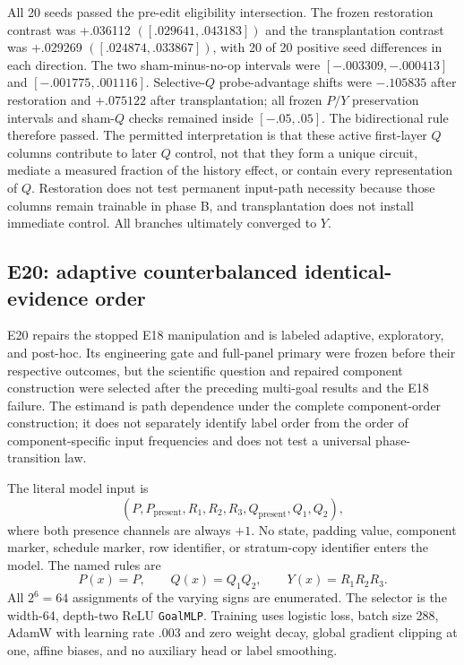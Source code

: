 \documentclass[11pt,a4paper]{article}
\begin{document}
All 20 seeds passed the pre-edit eligibility intersection. The frozen restoration contrast was +.036112 $([.029641,.043183])$ and the transplantation contrast was +.029269 $([.024874,.033867])$, with 20 of 20 positive seed differences in each direction. The two sham-minus-no-op intervals were $[-.003309,-.000413]$ and $[-.001775,.001116]$. Selective-$Q$ probe-advantage shifts were $-.105835$ after restoration and $+.075122$ after transplantation; all frozen $P/Y$ preservation intervals and sham-$Q$ checks remained inside $[-.05,.05]$. The bidirectional rule therefore passed. The permitted interpretation is that these active first-layer $Q$ columns contribute to later $Q$ control, not that they form a unique circuit, mediate a measured fraction of the history effect, or contain every representation of $Q$. Restoration does not test permanent input-path necessity because those columns remain trainable in phase B, and transplantation does not install immediate control. All branches ultimately converged to $Y$.

\subsection{E20: adaptive counterbalanced identical-evidence order}

E20 repairs the stopped E18 manipulation and is labeled adaptive, exploratory, and post-hoc. Its engineering gate and full-panel primary were frozen before their respective outcomes, but the scientific question and repaired component construction were selected after the preceding multi-goal results and the E18 failure. The estimand is path dependence under the complete component-order construction; it does not separately identify label order from the order of component-specific input frequencies and does not test a universal phase-transition law.

The literal model input is
\[
(P,P_{\mathrm{present}},R_1,R_2,R_3,Q_{\mathrm{present}},Q_1,Q_2),
\]
where both presence channels are always $+1$. No state, padding value, component marker, schedule marker, row identifier, or stratum-copy identifier enters the model. The named rules are
\[
P(x)=P,\qquad Q(x)=Q_1Q_2,\qquad Y(x)=R_1R_2R_3.
\]
All $2^6=64$ assignments of the varying signs are enumerated. The selector is the width-64, depth-two ReLU \texttt{GoalMLP}. Training uses logistic loss, batch size 288, AdamW with learning rate .003 and zero weight decay, global gradient clipping at one, affine biases, and no auxiliary head or label smoothing.
\end{document}
